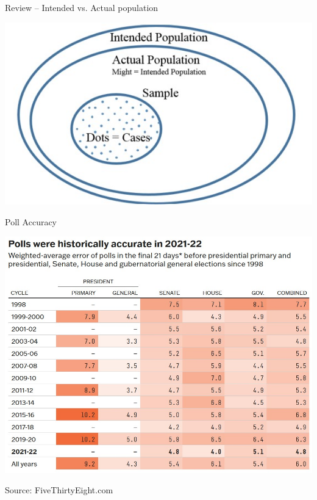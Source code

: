 \documentclass{beamer}
\begin{document}
\begin{frame}{Review -- Intended vs. Actual population}
\begin{center}
    \includegraphics[]{img/actual_intended_pop.jpg}
\end{center}
\end{frame}

\begin{frame}{Poll Accuracy}
\begin{center}
    \includegraphics[scale=.55]{img/538_accurate_polling.jpg}
\end{center}
\footnotesize Source: FiveThirtyEight.com
\end{frame}
\end{document}

